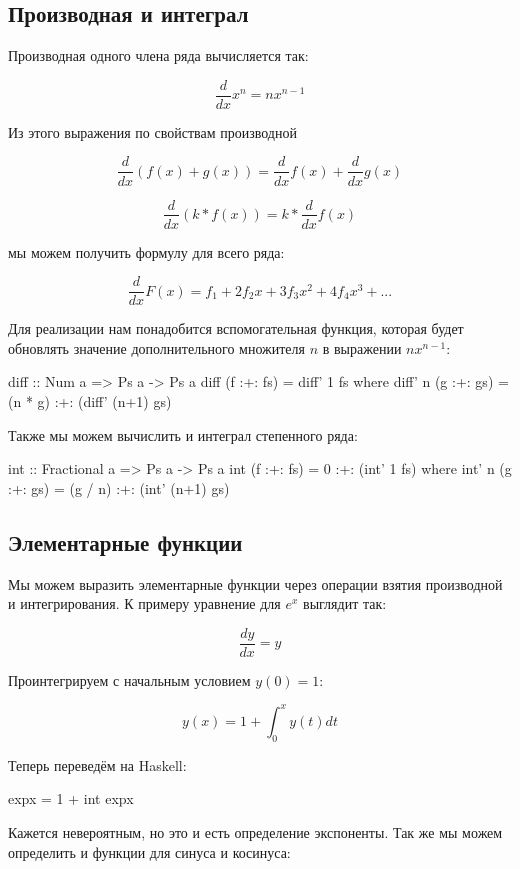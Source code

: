 \subsection{Производная и интеграл}

Производная одного члена ряда вычисляется так:

\[\frac{d}{dx} x^n = n x^{n-1}\]

Из этого выражения по свойствам производной

\[\frac{d}{dx}(f(x) + g(x)) =  \frac{d}{dx}f(x) +  \frac{d}{dx}g(x)\]

\[\frac{d}{dx} (k * f(x)) = k *  \frac{d}{dx} f(x)\]

мы можем получить формулу для всего ряда:

\[\frac{d}{dx} F(x) = f_1 + 2 f_2 x + 3 f_3 x^2 + 4 f_4 x^3 + ...\]

Для реализации нам понадобится вспомогательная функция, которая будет
обновлять значение дополнительного множителя $n$ в выражении
$n x^{n-1}$:


\begin{code}
diff :: Num a => Ps a -> Ps a
diff (f :+: fs) = diff' 1 fs
    where diff' n (g :+: gs) = (n * g) :+: (diff' (n+1) gs)
\end{code}

Также мы можем вычислить и интеграл степенного ряда:


\begin{code}
int :: Fractional a => Ps a -> Ps a
int (f :+: fs) = 0 :+: (int' 1 fs) 
    where int' n (g :+: gs) = (g / n) :+: (int' (n+1) gs)
\end{code}

\subsection{Элементарные функции}

Мы можем выразить элементарные функции через операции взятия производной
и интегрирования. К примеру уравнение для $e^x$ выглядит так:

\[\frac{dy}{dx} = y\]

Проинтегрируем с начальным условием $y(0) = 1$:

\[y(x) = 1 + \int_0^x y(t) dt\]

Теперь переведём на Haskell:


\begin{code}
expx = 1 + int expx
\end{code}

Кажется невероятным, но это и есть определение экспоненты. Так же мы
можем определить и функции для синуса и косинуса:

